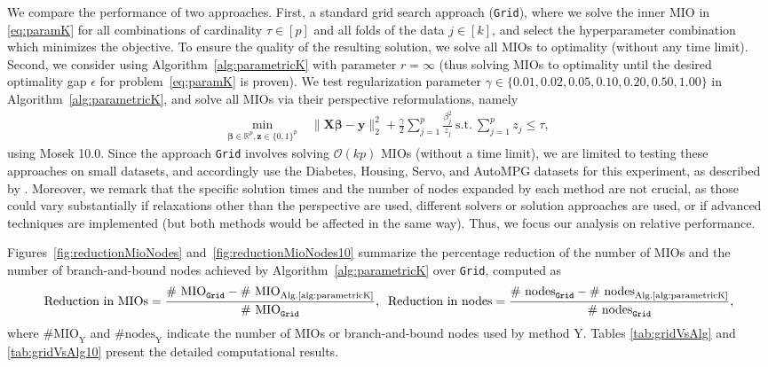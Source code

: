 \documentclass[ijoc,noblindrev]{informs3} %
\begin{document}
We compare the performance of two approaches. First, a standard grid search approach (\texttt{Grid}), where we solve the inner MIO in \eqref{eq:paramK} for all combinations of cardinality $\tau\in [p]$ and all folds of the data $j\in [k]$, and select the hyperparameter combination which minimizes the objective. To ensure the quality of the resulting solution, we solve all MIOs to optimality (without any time limit). Second, we consider using Algorithm~\ref{alg:parametricK} with parameter $r=\infty$ (thus solving MIOs to optimality until the desired optimality gap $\epsilon$ for problem~\eqref{eq:paramK} is proven). We test regularization parameter $\gamma\in \{0.01,0.02,0.05,0.10,0.20,0.50,1.00\}$ in Algorithm~\ref{alg:parametricK}, and solve all MIOs via their perspective reformulations, namely
\begin{align*}
	\min_{\bm{\beta}\in \mathbb{R}^p,\bm{z}\in \{0,1\}^p}\;& \|\bm{X}\bm{\beta}-\bm{y}\|_2^2+\frac{\gamma}{2}\sum_{j=1}^p \frac{\beta_j^2}{z_j}\ \text{s.t.}\ \sum_{j=1}^p z_j\leq \tau,
\end{align*} 
using Mosek 10.0. Since the approach \texttt{Grid} involves solving $\mathcal{O}(kp)$ MIOs (without a time limit), we are limited to testing these approaches on small datasets, and accordingly use the Diabetes, Housing, Servo, and AutoMPG datasets for this experiment, as described by \cite{gomez2021mixed}. Moreover, we remark that the specific solution times and the number of nodes expanded by each method are not crucial, as those could vary substantially if relaxations other than the perspective are used, different solvers or solution approaches are used, or if advanced techniques are implemented (but both methods would be affected in the same way). Thus, we focus our analysis on relative performance.

Figures~\ref{fig:reductionMioNodes} and~\ref{fig:reductionMioNodes10} summarize the percentage reduction of the number of MIOs and the number of branch-and-bound nodes achieved by Algorithm~\ref{alg:parametricK} over \texttt{Grid}, computed as 
\small$$ \text{Reduction in MIOs}=\frac{\text{\# MIO}_{\texttt{Grid}}-\text{\# MIO}_{\text{Alg.\ref{alg:parametricK}}}}{\text{\# MIO}_{\texttt{Grid}}},\;\; \text{Reduction in nodes}=\frac{\text{\# nodes}_{\texttt{Grid}}-\text{\# nodes}_{\text{Alg.\ref{alg:parametricK}}}}{\text{\# nodes}_{\texttt{Grid}}},$$\normalsize
where $\text{\# MIO}_{\text{Y}}$ and $\text{\# nodes}_{\text{Y}}$ indicate the number of MIOs or branch-and-bound nodes used by method Y.  Tables \ref{tab:gridVsAlg} and \ref{tab:gridVsAlg10} present the detailed computational results. 
\end{document}
